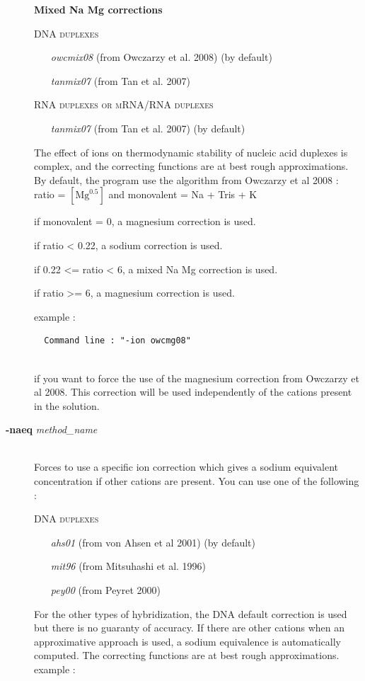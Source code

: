 \documentclass{article}
\begin{document}
\begin{description}
  \textbf{Mixed Na Mg corrections}
  
    \textsc{DNA duplexes}
      \begin{itemize}
      \item [\textit{owcmix08}] (from Owczarzy et al. 2008)  (by default)
      \item [\textit{tanmix07}] (from Tan et al. 2007)	 	  
      \end{itemize}
    \textsc{RNA duplexes or mRNA/RNA duplexes}
      \begin{itemize}
      \item [\textit{tanmix07}] (from Tan et al. 2007)  (by default)
      \end{itemize}
  The effect of ions on  thermodynamic  stability  of nucleic  acid duplexes is complex, and the correcting 
  functions are  at  best rough  approximations.
  By default, the program use the algorithm from Owczarzy et al 2008 : ratio =
  $[\mbox{Mg}^{0.5}]$ and monovalent = Na + Tris + K
  
  if monovalent = 0, a magnesium correction is used.
  
  if ratio < 0.22, a sodium correction is used.
  
  if 0.22 <= ratio < 6, a mixed Na Mg correction is used.
  
  if ratio >= 6, a magnesium correction is used.
  
  example :
  
  \begin{verbatim}
  Command line : "-ion owcmg08" 
  
  \end{verbatim}
  if you want to force the use of the magnesium correction from Owczarzy et al 2008. This correction will be used 
  independently of the cations present in the solution.
\item [\textbf{-naeq} \textit{method\_name}]\mbox{}\\ 
  Forces to use a specific ion correction which gives a sodium equivalent concentration if other cations are present.
  You can use one of the following :
  
  \textsc{DNA duplexes}
    \begin{itemize}
    \item [\textit{ahs01}] (from von Ahsen et al 2001)  (by default)
    \item [\textit{mit96}] (from Mitsuhashi et al. 1996)
    \item [\textit{pey00}] (from Peyret 2000)		 
    \end{itemize}
  For the other types of hybridization, the DNA default correction is used but there is no guaranty of accuracy.
  If there are other cations when an approximative approach is used, a sodium equivalence is automatically computed.
  The correcting functions are  at  best rough  approximations.
  example :
  

\end{description}
\end{document}
